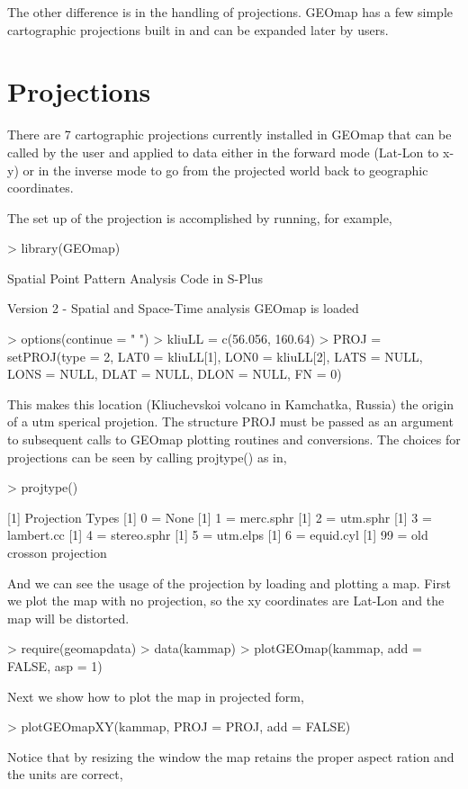 \documentclass{article}
\begin{document}
The other difference is in the handling of projections.  GEOmap
has a few simple cartographic projections built in 
and can be expanded later by users.


\section{Projections}

There are  7 cartographic projections currently installed in 
GEOmap that can be called by the user and applied to data
either in the forward mode (Lat-Lon to x-y) or in the inverse
mode to go from the projected world back to geographic coordinates.

The set up of the projection is accomplished by 
running, for example,

\begin{Schunk}
\begin{Sinput}
> library(GEOmap)
\end{Sinput}
Spatial Point Pattern Analysis Code in S-Plus

 Version 2 - Spatial and Space-Time analysis
GEOmap is loaded\begin{Sinput}
> options(continue = " ")
> kliuLL = c(56.056, 160.64)
> PROJ = setPROJ(type = 2, LAT0 = kliuLL[1], LON0 = kliuLL[2], 
     LATS = NULL, LONS = NULL, DLAT = NULL, DLON = NULL, FN = 0)
\end{Sinput}
\end{Schunk}

This makes this location (Kliuchevskoi volcano in Kamchatka, Russia) the origin 
of a utm sperical projetion.
The structure PROJ must be passed as an argument to subsequent 
calls to GEOmap plotting routines and conversions.
The choices for projections can be seen by calling  projtype()
as in,
\begin{Schunk}
\begin{Sinput}
> projtype()
\end{Sinput}
[1] Projection Types
[1] 0 = None
[1] 1 = merc.sphr
[1] 2 = utm.sphr
[1] 3 = lambert.cc
[1] 4 = stereo.sphr
[1] 5 = utm.elps
[1] 6 = equid.cyl
[1] 99 = old crosson projection\end{Schunk}
And we can see the usage of the projection by loading and plotting a map.
First we plot the map with no projection, so the xy coordinates are Lat-Lon
and the map will be distorted.
\begin{Schunk}
\begin{Sinput}
> require(geomapdata)
> data(kammap)
> plotGEOmap(kammap, add = FALSE, asp = 1)
\end{Sinput}
\end{Schunk}
Next we show how to plot the map in projected form,
\begin{Schunk}
\begin{Sinput}
> plotGEOmapXY(kammap, PROJ = PROJ, add = FALSE)
\end{Sinput}
\end{Schunk}
Notice that by resizing the window the map retains the proper
aspect ration and the units are correct,
\end{document}
